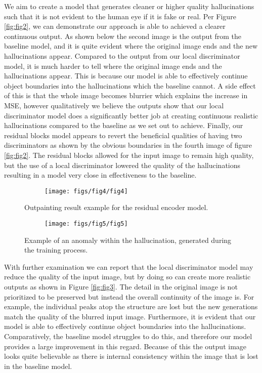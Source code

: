 \documentclass{article}
\begin{document}
We aim to create a model that generates cleaner or higher quality hallucinations such that it is not evident to the human eye if it is fake or real. Per Figure \ref{fig:fig2}, we can demonstrate our approach is able to achieved a clearer continuous output. As shown below the second image is the output from the baseline model, and it is quite evident where the original image ends and the new hallucinations appear. Compared to the output from our local discriminator model, it is much harder to tell where the original image ends and the hallucinations appear. This is because our model is able to effectively continue object boundaries into the hallucinations which the baseline cannot. A side effect of this is that the whole image becomes blurrier which explains the increase in MSE, however qualitatively we believe the outputs show that our local discriminator model does a significantly better job at creating continuous realistic hallucinations compared to the baseline as we set out to achieve. Finally, our residual blocks model appears to revert the beneficial qualities of having two discriminators as shown by the obvious boundaries in the fourth image of figure \ref{fig:fig2}. The residual blocks allowed for the input image to remain high quality, but the use of a local discriminator lowered the quality of the hallucinations resulting in a model very close in effectiveness to the baseline.

\begin{figure}
	\captionsetup[subfigure]{labelformat=empty}
    \centering
    \begin{subfigure}[b]{0.25\textwidth}
        \texttt{[image: figs/fig4/fig4]}
    \end{subfigure}
  	\caption{Outpainting result example for the residual encoder model.}
  	\label{fig:fig4}
\end{figure}

\begin{figure}
	\captionsetup[subfigure]{labelformat=empty}
    \centering
    \begin{subfigure}[b]{0.25\textwidth}
        \texttt{[image: figs/fig5/fig5]}
    \end{subfigure}
  	\caption{Example of an anomaly within the hallucination, generated during the training process.}
  	\label{fig:fig5}
\end{figure}

With further examination we can report that the local discriminator model may reduce the quality of the input image, but by doing so can create more realistic outputs as shown in Figure \ref{fig:fig3}. The detail in the original image is not prioritized to be preserved but instead the overall continuity of the image is. For example, the individual peaks atop the structure are lost but the new generations match the quality of the blurred input image. Furthermore, it is evident that our model is able to effectively continue object boundaries into the hallucinations. Comparatively, the baseline model struggles to do this, and therefore our model provides a large improvement in this regard. Because of this the output image looks quite believable as there is internal consistency within the image that is lost in the baseline model.
\end{document}
